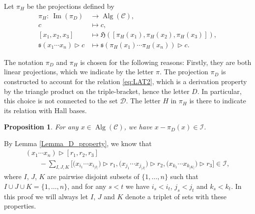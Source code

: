 \documentclass[10pt,a4paper]{amsart}
\newcommand{\Img}{\operatorname{Im}}
\newcommand*{\Alg}{\operatorname{Alg}}
\numberwithin{equation}{section}
\newtheorem{Proposition}[Theorem]{Proposition}
 { \theoremstyle{definition}
\newtheorem{Definition}[Theorem]{Definition}
\newtheorem{Note}[Theorem]{Note}
\newtheorem{Example}[Theorem]{Example}
\newtheorem{Remark}[Theorem]{Remark} }
\begin{document}
Let $\pi_H$ be the projections defined by
\begin{align*}
 \pi_H\colon \ \Img(\pi_D) &\longrightarrow \Alg(\mathcal{C}), \\
 c & \longmapsto c, \\
 [x_1, x_2 ,x_3] &\longmapsto \mathfrak{H}([\pi_H(x_1), \pi_H(x_2) , \pi_H(x_3)] ), \\
 \mathfrak{s}(x_1 \cdots x_n) \rhd c & \longmapsto \mathfrak{s}(\pi_H(x_1) \cdots \pi_H(x_n))\rhd c.
\end{align*}

\begin{Note}
 The notation $\pi_D$ and $\pi_H$ is chosen for the following reasons: Firstly, they are both linear projections, which we indicate by the letter $\pi$. The projection $\pi_D$ is constructed to account for the relation \eqref{eq:LAT2}, which is a derivation property by the triangle product on the triple-bracket, hence the letter $D$. In particular, this choice is not connected to the set $\mathcal{D}$. The letter $H$ in $\pi_H$ is there to indicate its relation with Hall bases.
\end{Note}


\begin{Proposition}\label{id-D_in_I}
For any $x \in \Alg(\mathcal{C})$, we have $x-\pi_D(x) \in \mathcal{I}$.
\end{Proposition}

By Lemma \ref{Lemma_D_property}, we know that
\begin{gather*}
 (x_1 \cdots x_n) \rhd [r_1, r_2, r_3] \\
\qquad - \sum_{I,J,K} \bigl[\bigl(x_{i_1} \cdots x_{i_{|I|}}\bigr) \rhd r_1, \bigl(x_{j_1} \cdots x_{j_{|J|}}\bigr) \rhd r_2, \bigl(x_{k_1} \cdots x_{k_{|K|}}\bigr) \rhd r_3\bigr] \in \mathcal{I},
\end{gather*}
where $I$, $J$, $K$ are pairwise disjoint subsets of $\{1, \dots , n\}$ such that $I \cup J \cup K = \{1, \dots , n \}$, and for any $s < t$ we have $i_s < i_t$, $j_s < j_t$ and $k_s < k_t$. In this proof we will always let $I$, $J$ and $K$ denote a triplet of sets with these properties.
\end{document}
